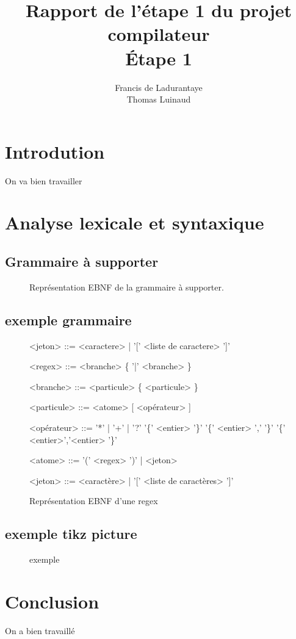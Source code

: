 \documentclass[]{article}
\title{Rapport de l'étape 1 du projet compilateur \\ Étape 1}
\author{Francis de Ladurantaye \\ Thomas Luinaud}
\begin{document}
\begin{titlepage}
	\maketitle
\end{titlepage}


\section{Introdution}
On va bien travailler

\section{Analyse lexicale et syntaxique}

\subsection{Grammaire à supporter}

\begin{figure}
	
	\caption{Représentation EBNF de la grammaire à supporter.}
\end{figure}

\subsection{exemple grammaire}
\begin{figure}[]
	\begin{grammarC}{<jeton> ::= <caractere> | '[' <liste de caractere> ']'}
		
		<regex> ::= <branche> \{ '|' <branche> \}
		
		<branche> ::= <particule> \{ <particule> \}
		
		<particule> ::= <atome>  [ <opérateur> ]
		
		<opérateur> ::= '*' | '+' | '?' 
		\alt  '\{' <entier> '\}' 
		\alt  '\{' <entier> ',' '\}' 
		\alt '\{' <entier>','<entier>  '\}'
		
		<atome> ::= '(' <regex> ')' | <jeton>
		
		<jeton> ::= <caractère> | '[' <liste de caractères> ']'
		
	\end{grammarC}
	\caption{Représentation EBNF d'une regex}
\end{figure}


\subsection{exemple tikz picture}
\begin{figure}
	
	\caption{exemple}
\end{figure}


\section{Conclusion}
On a bien travaillé
\end{document}
